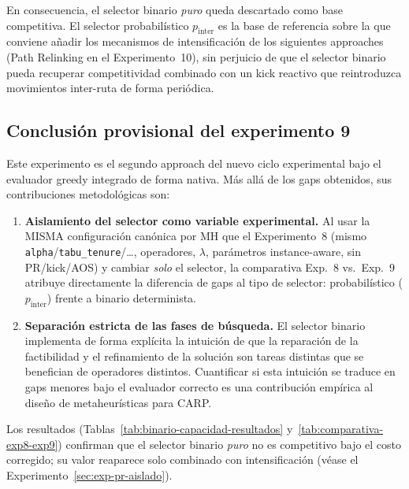 En consecuencia, el selector binario \emph{puro} queda descartado como
base competitiva. El selector probabilístico $p_{\text{inter}}$ es la
base de referencia sobre la que conviene añadir los mecanismos de
intensificación de los siguientes approaches (Path Relinking en el
Experimento~10), sin perjuicio de que el selector binario pueda
recuperar competitividad combinado con un kick reactivo que reintroduzca
movimientos inter-ruta de forma periódica.

\subsection{Conclusión provisional del experimento 9}

Este experimento es el segundo approach del nuevo ciclo experimental
bajo el evaluador greedy integrado de forma nativa. Más allá de los gaps
obtenidos, sus contribuciones metodológicas son:

\begin{enumerate}
\item \textbf{Aislamiento del selector como variable experimental.}
  Al usar la MISMA configuración canónica por MH que el Experimento~8
  (mismo \texttt{alpha}/\texttt{tabu\_tenure}/\dots, operadores, $\lambda$,
  parámetros instance-aware, sin PR/kick/AOS) y cambiar \emph{solo} el
  selector, la comparativa Exp.~8 vs.\ Exp.~9 atribuye directamente la
  diferencia de gaps al tipo de selector: probabilístico
  ($p_{\text{inter}}$) frente a binario determinista.
\item \textbf{Separación estricta de las fases de búsqueda.}
  El selector binario implementa de forma explícita la intuición de
  que la reparación de la factibilidad y el refinamiento de la solución
  son tareas distintas que se benefician de operadores distintos.
  Cuantificar si esta intuición se traduce en gaps menores bajo el
  evaluador correcto es una contribución empírica al diseño de
  metaheurísticas para CARP.
\end{enumerate}

Los resultados (Tablas~\ref{tab:binario-capacidad-resultados}
y~\ref{tab:comparativa-exp8-exp9}) confirman que el selector binario
\emph{puro} no es competitivo bajo el costo corregido; su valor reaparece
solo combinado con intensificación (véase el Experimento~\ref{sec:exp-pr-aislado}).
